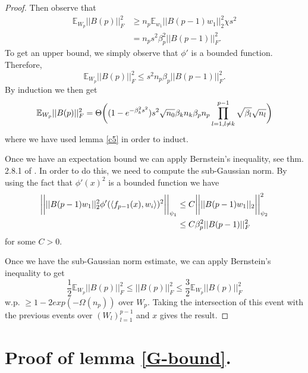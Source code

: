 \documentclass{article}
\theoremstyle{plain}
\theoremstyle{definition}
\theoremstyle{remark}
\begin{document}
\begin{proof}
Then observe that
\begin{align*}
\mathbb{E}_{W_p}\vert\vert B(p)\vert\vert_F^2 &\geq 
n_p\mathbb{E}_{w_1}\vert\vert B(p-1)w_1\vert\vert_2^2\chi s^2 \\
&= n_ps^2\beta_p^2\vert\vert B(p-1)\vert\vert_F^2.
\end{align*}
To get an upper bound, we simply observe that $\phi'$ is a bounded function. Therefore, 
\begin{equation*}
\mathbb{E}_{W_p}\vert\vert B(p)\vert\vert_F^2 \leq 
s^2n_p\beta_p\vert\vert B(p-1)\vert\vert_F^2. 
\end{equation*}
By induction we then get 
\begin{equation*}
\mathbb{E}_{W_p}\vert\vert B(p)\vert\vert_F^2 = \Theta\bigg{(}
(1-e^{-\beta_k^2s^2})s^2\sqrt{n_0}\beta_kn_k\beta_pn_p\prod_{l=1, l\neq k}^{p-1}\sqrt{\beta_l}\sqrt{n_l}
\bigg{)}
\end{equation*}
where we have used lemma \ref{c5} in order to induct. 




Once we have an expectation bound we can apply Bernstein's inequality, see thm. 2.8.1 of \cite{vershynin2018high}. In order to do this, we need to compute the sub-Gaussian norm. By using the fact that $\phi'(x)^2$ is a bounded function we have
\begin{align*}
	\bigg{\vert}\bigg{\vert}
	\vert\vert B(p-1)w_1\vert\vert^2_2
	\phi'(\langle f_{p-1}(x), w_i\rangle)^2
	\bigg{\vert}\bigg{\vert}_{\psi_1} &\leq 
	C\bigg{\vert}\bigg{\vert} \vert\vert B(p-1)w_1\vert\vert_2
	\bigg{\vert}\bigg{\vert}^2_{\psi_2} \\
	&\leq C\beta_p^2\vert\vert B(p-1)\vert\vert_F^2
\end{align*}
for some $C > 0$.

Once we have the sub-Gaussian norm estimate, we can apply Bernstein's inequality 
to get
\begin{equation*}
\frac{1}{2}\mathbb{E}_{W_p}\vert\vert B(p)\vert\vert_F^2 \leq 
\vert\vert B(p)\vert\vert_F^2 \leq \frac{3}{2}\mathbb{E}_{W_p}
\vert\vert B(p)\vert\vert_F^2
\end{equation*}
w.p. $\geq 1 - 2exp(-\Omega(n_p))$ over $W_p$. Taking the intersection of this event with the previous events over $(W_l)_{l=1}^{p-1}$ and $x$ gives the result.
\end{proof}


\section{Proof of lemma \ref{G-bound}.}\label{sec_G-bound_proof}
\end{document}
